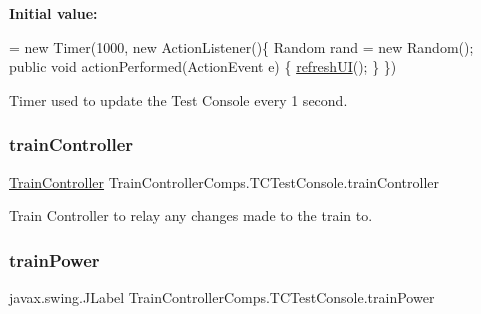 {\bfseries Initial value\+:}
\begin{DoxyCode}
= \textcolor{keyword}{new} Timer(1000, \textcolor{keyword}{new} ActionListener()\{
        Random rand = \textcolor{keyword}{new} Random(); 
        \textcolor{keyword}{public} \textcolor{keywordtype}{void} actionPerformed(ActionEvent e) \{
            \hyperlink{classTrainControllerComps_1_1TCTestConsole_a8c36f9ef39a0e5b17ff982eb9a5fb2d1}{refreshUI}();    
            \}
        \})
\end{DoxyCode}


Timer used to update the Test Console every 1 second. 

\mbox{\label{classTrainControllerComps_1_1TCTestConsole_a12271d14ee26a5ac90db1e541954b788}} 
\subsubsection{\texorpdfstring{train\+Controller}{trainController}}
{\footnotesize\ttfamily \hyperlink{classTrainControllerComps_1_1TrainController}{Train\+Controller} Train\+Controller\+Comps.\+T\+C\+Test\+Console.\+train\+Controller\hspace{0.3cm}{\ttfamily [private]}}



Train Controller to relay any changes made to the train to. 

\mbox{\label{classTrainControllerComps_1_1TCTestConsole_a1e94ccf980f441f8e7c411ed38c42be5}} 
\subsubsection{\texorpdfstring{train\+Power}{trainPower}}
{\footnotesize\ttfamily javax.\+swing.\+J\+Label Train\+Controller\+Comps.\+T\+C\+Test\+Console.\+train\+Power\hspace{0.3cm}{\ttfamily [private]}}

